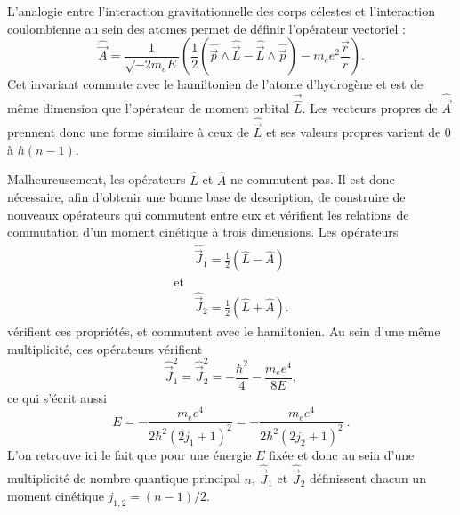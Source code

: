 L'analogie entre l'interaction gravitationnelle des corps célestes et l'interaction coulombienne au sein des atomes permet de définir l'opérateur vectoriel :
\begin{equation}\label{eq:RungeLenz}
\hat{\vec{A}} = \frac{1}{\sqrt{-2m_e E}} \left( \frac{1}{2} (\hat{\vec{p}}\wedge\hat{\vec{L}} - \hat{\vec{L}}\wedge\hat{\vec{p}}) - m_e e^2 \frac{\vec{r}}{r} \right).
\end{equation}
Cet invariant commute avec le hamiltonien de l'atome d'hydrogène et est de même dimension que l'opérateur de moment orbital $\vec{\hat{L}}$.
Les vecteurs propres de $\hat{\vec{A}}$ prennent donc une forme similaire à ceux de $\hat{\vec{L}}$ et ses valeurs propres varient de $0$ à $\hbar(n-1)$.

Malheureusement, les opérateurs $\hat{L}$ et $\hat{A}$ ne commutent pas.
Il est donc nécessaire, afin d'obtenir une bonne base de description, de construire de nouveaux opérateurs qui commutent entre eux et vérifient les relations de commutation d'un moment cinétique à trois dimensions.
Les opérateurs
\begin{equation}\label{eq:defJ1J2}
\begin{aligned}
&\hat{\vec{J}}_1 = \frac{1}{2}\left( \hat{L} - \hat{A} \right)\\
\text{et} & \\
&\hat{\vec{J}}_2 = \frac{1}{2}\left( \hat{L} + \hat{A} \right).
\end{aligned}
\end{equation}
vérifient ces propriétés, et commutent avec le hamiltonien.
Au sein d'une même multiplicité, ces opérateurs vérifient 
\begin{equation}\label{eq:defJ1J2sq}
\hat{\vec{J}}_1^2 = \hat{\vec{J}}_2^2 = -\frac{\hbar^2}{4}-\frac{m_ee^4}{8E},
\end{equation}
ce qui s'écrit aussi
\begin{equation}\label{eq:E_j1_j2}
E=-\frac{m_ee^4}{2\hbar^2(2j_1+1)^2}=-\frac{m_ee^4}{2\hbar^2(2j_2+1)^2}~.
\end{equation}
L'on retrouve ici le fait que pour une énergie $E$ fixée et donc au sein d'une multiplicité de nombre quantique principal $n$, $\hat{\vec{J}}_1$ et $\hat{\vec{J}}_2$ définissent chacun un moment cinétique $j_{1,2}=(n-1)/2$.


